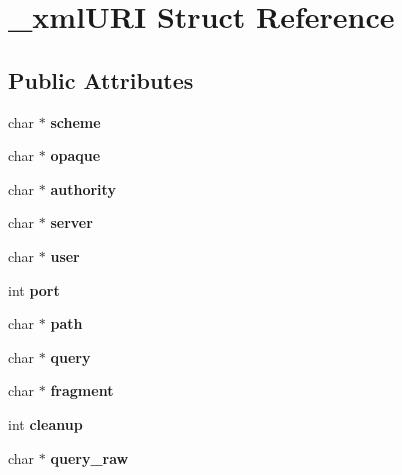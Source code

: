 \hypertarget{struct__xml_u_r_i}{}\section{\+\_\+xml\+U\+RI Struct Reference}
\label{struct__xml_u_r_i}
\subsection*{Public Attributes}
\begin{DoxyCompactItemize}
\item 
\mbox{\label{struct__xml_u_r_i_a897cb3959ee230d9e647ec2443440024}} 
char $\ast$ {\bfseries scheme}
\item 
\mbox{\label{struct__xml_u_r_i_a40922d0937ac65c01ab443b85d7e0dd4}} 
char $\ast$ {\bfseries opaque}
\item 
\mbox{\label{struct__xml_u_r_i_a0258d553bc7e5732559e085c229674b5}} 
char $\ast$ {\bfseries authority}
\item 
\mbox{\label{struct__xml_u_r_i_a045a61b724d4d5d9c2c4b3c67e4bd120}} 
char $\ast$ {\bfseries server}
\item 
\mbox{\label{struct__xml_u_r_i_a7179d65bb0a6e8b36562e562b7eb6c4a}} 
char $\ast$ {\bfseries user}
\item 
\mbox{\label{struct__xml_u_r_i_a8460fd17316181c550e4f5b04e212eba}} 
int {\bfseries port}
\item 
\mbox{\label{struct__xml_u_r_i_a824d1521bda42a7d301a7a9c57484dc5}} 
char $\ast$ {\bfseries path}
\item 
\mbox{\label{struct__xml_u_r_i_ad6bacae3f53944b3224f8b8ae22a7126}} 
char $\ast$ {\bfseries query}
\item 
\mbox{\label{struct__xml_u_r_i_ae291e87e8f3bae519660a4087efeaf39}} 
char $\ast$ {\bfseries fragment}
\item 
\mbox{\label{struct__xml_u_r_i_a88f7bca5886e16c467eb1e1d4e729059}} 
int {\bfseries cleanup}
\item 
\mbox{\label{struct__xml_u_r_i_a614f1c8a9b677319d57568bcd2253ce8}} 
char $\ast$ {\bfseries query\+\_\+raw}
\end{DoxyCompactItemize}


